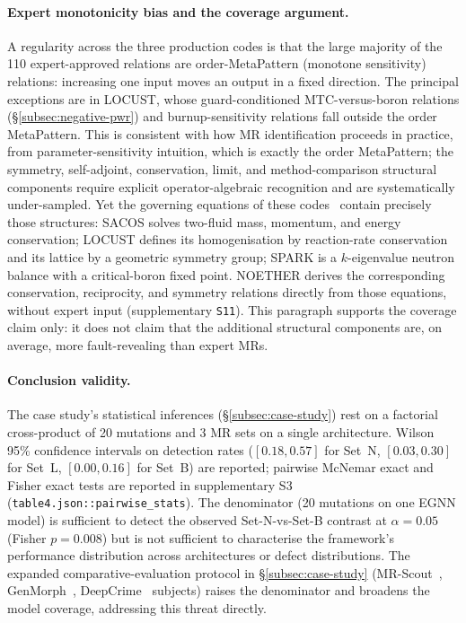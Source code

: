 \documentclass[acmsmall,screen,review]{acmart}
\begin{document}
\paragraph{Expert monotonicity bias and the coverage argument.} A regularity across the three production codes is that the large majority of the 110 expert-approved relations are order-MetaPattern (monotone sensitivity) relations: increasing one input moves an output in a fixed direction. The principal exceptions are in LOCUST, whose guard-conditioned MTC-versus-boron relations (\S\ref{subsec:negative-pwr}) and burnup-sensitivity relations fall outside the order MetaPattern. This is consistent with how MR identification proceeds in practice, from parameter-sensitivity intuition, which is exactly the order MetaPattern; the symmetry, self-adjoint, conservation, limit, and method-comparison structural components require explicit operator-algebraic recognition and are systematically under-sampled. Yet the governing equations of these codes~\cite{LamarshBaratta2001, Stacey2007} contain precisely those structures: SACOS solves two-fluid mass, momentum, and energy conservation; LOCUST defines its homogenisation by reaction-rate conservation and its lattice by a geometric symmetry group; SPARK is a $k$-eigenvalue neutron balance with a critical-boron fixed point. NOETHER derives the corresponding conservation, reciprocity, and symmetry relations directly from those equations, without expert input (supplementary \texttt{S11}). This paragraph supports the coverage claim only: it does not claim that the additional structural components are, on average, more fault-revealing than expert MRs.

\paragraph{Conclusion validity.} The case study's statistical inferences (\S\ref{subsec:case-study}) rest on a factorial cross-product of 20 mutations and 3 MR sets on a single architecture. Wilson 95\% confidence intervals on detection rates ($[0.18,0.57]$ for Set~N, $[0.03,0.30]$ for Set~L, $[0.00,0.16]$ for Set~B) are reported; pairwise McNemar exact and Fisher exact tests are reported in supplementary S3 (\texttt{table4.json::pairwise\_stats}). The denominator (20 mutations on one EGNN model) is sufficient to detect the observed Set-N-vs-Set-B contrast at $\alpha = 0.05$ (Fisher $p = 0.008$) but is not sufficient to characterise the framework's performance distribution across architectures or defect distributions. The expanded comparative-evaluation protocol in \S\ref{subsec:case-study} (MR-Scout~\cite{MRScout2024}, GenMorph~\cite{GenMorph2024}, DeepCrime~\cite{Humbatova2021DeepCrime} subjects) raises the denominator and broadens the model coverage, addressing this threat directly.
\end{document}
